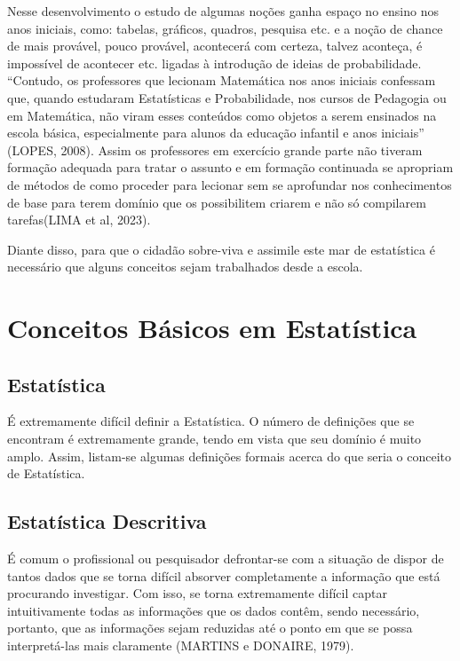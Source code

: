 \documentclass[
  letterpaper,
  DIV=11,
  numbers=noendperiod]{scrreprt}
\begin{document}
Nesse desenvolvimento o estudo de algumas noções ganha espaço no ensino
nos anos iniciais, como: tabelas, gráficos, quadros, pesquisa etc. e a
noção de chance de mais provável, pouco provável, acontecerá com
certeza, talvez aconteça, é impossível de acontecer etc. ligadas à
introdução de ideias de probabilidade. ``Contudo, os professores que
lecionam Matemática nos anos iniciais confessam que, quando estudaram
Estatísticas e Probabilidade, nos cursos de Pedagogia ou em Matemática,
não viram esses conteúdos como objetos a serem ensinados na escola
básica, especialmente para alunos da educação infantil e anos iniciais''
(LOPES, 2008). Assim os professores em exercício grande parte não
tiveram formação adequada para tratar o assunto e em formação continuada
se apropriam de métodos de como proceder para lecionar sem se aprofundar
nos conhecimentos de base para terem domínio que os possibilitem criarem
e não só compilarem tarefas(LIMA et al, 2023).

Diante disso, para que o cidadão sobre-viva e assimile este mar de
estatística é necessário que alguns conceitos sejam trabalhados desde a
escola.

\hypertarget{conceitos-buxe1sicos-em-estatuxedstica}{%
\section{Conceitos Básicos em
Estatística}\label{conceitos-buxe1sicos-em-estatuxedstica}}

\hypertarget{estatuxedstica}{%
\subsection{Estatística}\label{estatuxedstica}}

É extremamente difícil definir a Estatística. O número de definições que
se encontram é extremamente grande, tendo em vista que seu domínio é
muito amplo. Assim, listam-se algumas definições formais acerca do que
seria o conceito de Estatística.

\hypertarget{estatuxedstica-descritiva}{%
\subsection{Estatística Descritiva}\label{estatuxedstica-descritiva}}

É comum o profissional ou pesquisador defrontar-se com a situação de
dispor de tantos dados que se torna difícil absorver completamente a
informação que está procurando investigar. Com isso, se torna
extremamente difícil captar intuitivamente todas as informações que os
dados contêm, sendo necessário, portanto, que as informações sejam
reduzidas até o ponto em que se possa interpretá-las mais claramente
(MARTINS e DONAIRE, 1979).
\end{document}
